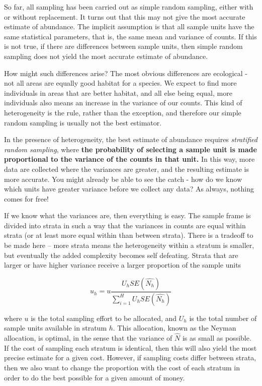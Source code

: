 \documentclass[]{book}
\theoremstyle{definition}
\theoremstyle{definition}
\theoremstyle{definition}
\theoremstyle{remark}
\begin{document}
So far, all sampling has been carried out as simple random sampling,
either with or without replacement. It turns out that this may not give
the most accurate estimate of abundance. The implicit assumption is that
all sample units have the same statistical parameters, that is, the same
mean and variance of counts. If this is not true, if there are
differences between sample units, then simple random sampling does not
yield the most accurate estimate of abundance.

How might such differences arise? The most obvious differences are
ecological - not all areas are equally good habitat for a species. We
expect to find more individuals in areas that are better habitat, and
all else being equal, more individuals also means an increase in the
variance of our counts. This kind of heterogeneity is the rule, rather
than the exception, and therefore our simple random sampling is usually
not the best estimator.

In the presence of heterogeneity, the best estimate of abundance
requires \emph{stratified random sampling}, where \textbf{the
probability of selecting a sample unit is made proportional to the
variance of the counts in that unit.} In this way, more data are
collected where the variances are greater, and the resulting estimate is
more accurate. You might already be able to see the catch - how do we
know which units have greater variance before we collect any data? As
always, nothing comes for free!

If we know what the variances are, then everything is easy. The sample
frame is divided into strata in such a way that the variances in counts
are equal within strata (or at least more equal within than between
strata). There is a tradeoff to be made here -- more strata means the
heterogeneity within a stratum is smaller, but eventually the added
complexity becomes self defeating. Strata that are larger or have higher
variance receive a larger proportion of the sample units

\begin{equation}
  u_h = u \frac{U_{h} SE\left(\hat{N_h}\right)}
               {\sum_{i=1}^{H}{U_{h} SE\left(\hat{N_h}\right)}}
  \label{eq:neymanallocation}
\end{equation}

where \(u\) is the total sampling effort to be allocated, and \(U_h\) is
the total number of sample units available in stratum \(h\). This
allocation, known as the Neyman allocation, is optimal, in the sense
that the variance of \(\hat{N}\) is as small as possible. If the cost of
sampling each stratum is identical, then this will also yield the most
precise estimate for a given cost. However, if sampling costs differ
between strata, then we also want to change the proportion with the cost
of each stratum in order to do the best possible for a given amount of
money.
\end{document}
